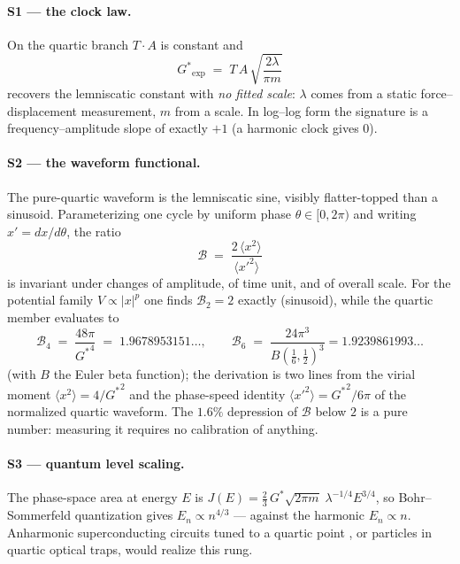 \documentclass[11pt,a4paper]{article}
\newcommand{\Gstar}{{G^{*}}}
\begin{document}
\paragraph{S1 --- the clock law.} On the quartic branch $T\cdot A$ is constant
and
\begin{equation}
\Gstar_{\mathrm{exp}} \;=\; T\,A\,\sqrt{\frac{2\lambda}{\pi m}}
\label{eq:recovery}
\end{equation}
recovers the lemniscatic constant with \emph{no fitted scale}: $\lambda$ comes
from a static force--displacement measurement, $m$ from a scale. In log--log
form the signature is a frequency--amplitude slope of exactly $+1$
(a harmonic clock gives $0$).

\paragraph{S2 --- the waveform functional.} The pure-quartic waveform is the
lemniscatic sine, visibly flatter-topped than a sinusoid. Parameterizing one
cycle by uniform phase $\theta\in[0,2\pi)$ and writing
$x'=dx/d\theta$, the ratio
\begin{equation}
\mathcal B \;=\; \frac{2\,\langle x^{2}\rangle}{\langle x'^{2}\rangle}
\label{eq:B}
\end{equation}
is invariant under changes of amplitude, of time unit, and of overall scale.
For the potential family $V\propto |x|^{p}$ one finds
$\mathcal B_2 = 2$ exactly (sinusoid), while the quartic member evaluates to
\begin{equation}
\mathcal B_4 \;=\; \frac{48\pi}{\Gstar^{4}} \;=\; 1.9678953151\ldots,
\qquad
\mathcal B_6 \;=\; \frac{24\pi^{3}}{B(\tfrac16,\tfrac12)^{3}}
= 1.9239861993\ldots
\label{eq:B4}
\end{equation}
(with $B$ the Euler beta function); the derivation is two lines from the
virial moment $\langle x^{2}\rangle = 4/\Gstar^{2}$ and the phase-speed
identity $\langle x'^{2}\rangle = \Gstar^{2}/6\pi$ of the normalized quartic
waveform. The $1.6\%$ depression of $\mathcal B$ below $2$ is a pure number:
measuring it requires no calibration of anything.

\paragraph{S3 --- quantum level scaling.} The phase-space area at energy $E$
is $J(E) = \tfrac{2}{3}\,\Gstar\sqrt{2\pi m}\;\lambda^{-1/4}E^{3/4}$, so
Bohr--Sommerfeld quantization gives $E_n \propto n^{4/3}$ --- against the
harmonic $E_n\propto n$. Anharmonic superconducting circuits tuned to a
quartic point \cite{quarton}, or particles in quartic optical traps, would
realize this rung.
\end{document}
